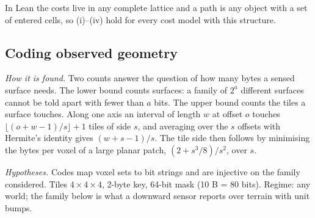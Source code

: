 \documentclass[11pt,a4paper]{article}
\begin{document}
In Lean the costs live in any complete lattice and a path is any object with a set of entered cells, so (i)--(iv)
hold for every cost model with this structure.

\subsection{Coding observed geometry}

\noindent\emph{How it is found.} Two counts answer the question of how many bytes a sensed surface needs. The lower bound counts surfaces: a family of
$2^a$ different surfaces cannot be told apart with fewer than $a$ bits. The upper bound counts the tiles a surface
touches. Along one axis an interval of length $w$ at offset $o$ touches $\lfloor(o+w-1)/s\rfloor+1$ tiles of side $s$,
and averaging over the $s$ offsets with Hermite's identity gives $(w+s-1)/s$. The tile side then follows by minimising
the bytes per voxel of a large planar patch, $(2+s^3/8)/s^2$, over $s$.

\noindent\emph{Hypotheses.} Codes map voxel sets to bit strings and are injective on the family considered. Tiles
$4\times4\times4$, 2-byte key, 64-bit mask (10 B = 80 bits). Regime: any world; the family below is what a downward
sensor reports over terrain with unit bumps.
\end{document}
